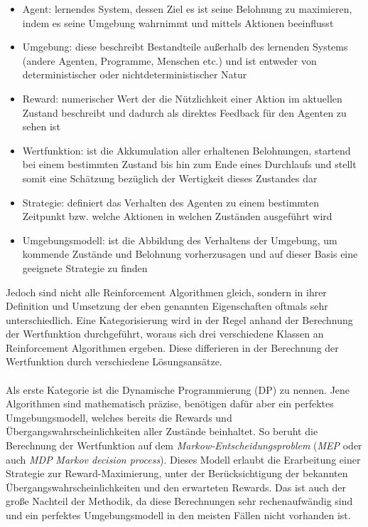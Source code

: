 \begin{itemize}
    \item Agent: lernendes System, dessen Ziel es ist seine Belohnung zu maximieren, indem es seine Umgebung wahrnimmt und mittels Aktionen beeinflusst
    \item Umgebung: diese beschreibt Bestandteile außerhalb des lernenden Systems (andere Agenten, Programme, Menschen etc.) und ist entweder von deterministischer oder nichtdeterministischer Natur
    \item Reward: numerischer Wert der die Nützlichkeit einer Aktion im aktuellen Zustand beschreibt und dadurch als direktes Feedback für den Agenten zu sehen ist
    \item Wertfunktion: ist die Akkumulation aller erhaltenen Belohnungen, startend bei einem bestimmten Zustand bis hin zum Ende eines Durchlaufs und stellt somit eine Schätzung bezüglich der Wertigkeit dieses Zustandes dar
    \item Strategie: definiert das Verhalten des Agenten zu einem bestimmten Zeitpunkt bzw. welche Aktionen in welchen Zuständen ausgeführt wird
    \item Umgebungsmodell: ist die Abbildung des Verhaltens der Umgebung, um kommende Zustände und Belohnung vorherzusagen und auf dieser Basis eine geeignete Strategie zu finden
\end{itemize}
Jedoch sind nicht alle Reinforcement Algorithmen gleich, sondern in ihrer Definition und Umsetzung der eben genannten Eigenschaften oftmals sehr unterschiedlich. Eine Kategorisierung wird in der Regel anhand der Berechnung der Wertfunktion durchgeführt, woraus sich drei verschiedene Klassen an Reinforcement Algorithmen ergeben. Diese differieren in der Berechnung der Wertfunktion durch verschiedene Lösungsansätze.\\\\
\newpage
Als erste Kategorie ist die Dynamische Programmierung (DP) zu nennen.
Jene Algorithmen sind mathematisch präzise, benötigen dafür aber ein perfektes Umgebungsmodell, welches bereits die Rewards und Übergangswahrscheinlichkeiten aller Zustände beinhaltet. So beruht die Berechnung der Wertfunktion auf dem \textit{Markow-Entscheidungsproblem} (\textit{MEP} oder auch \textit{MDP} \textit{Markov decision process}). Dieses Modell erlaubt die Erarbeitung einer Strategie zur Reward-Maximierung, unter der Berücksichtigung der bekannten Übergangswahrscheinlichkeiten und den erwarteten Rewards. 
Das ist auch der große Nachteil der Methodik, da diese Berechnungen sehr rechenaufwändig sind und ein perfektes Umgebungsmodell in den meisten Fällen nicht vorhanden ist.\\\\
